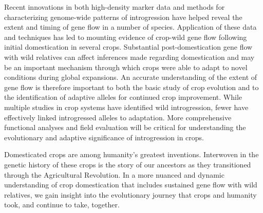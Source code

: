 \documentclass[11pt]{article}
\begin{document}
Recent innovations in both high-density marker data and methods for characterizing genome-wide patterns of introgression have helped reveal the extent and timing of gene flow in a number of species.
Application of these data and techniques has led to mounting evidence of crop-wild gene flow following initial domestication in several crops.
Substantial post-domestication gene flow with wild relatives can affect inferences made regarding domestication and may be an important mechanism through which crops were able to adapt to novel conditions during global expansions.
An accurate understanding of the extent of gene flow is therefore important to both the basic study of crop evolution and to the identification of adaptive alleles for continued crop improvement.
While multiple studies in crop systems have identified wild introgression, fewer have effectively linked introgressed alleles to adaptation.
More comprehensive functional analyses and field evaluation will be critical for understanding the evolutionary and adaptive significance of introgression in crops.

Domesticated crops are among humanity's greatest inventions.
Interwoven in the genetic history of these crops is the story of our ancestors as they transitioned through the Agricultural Revolution.
In a more nuanced and dynamic understanding of crop domestication that includes sustained gene flow with wild relatives, we gain insight into the evolutionary journey that crops and humanity took, and continue to take, together.
\end{document}
